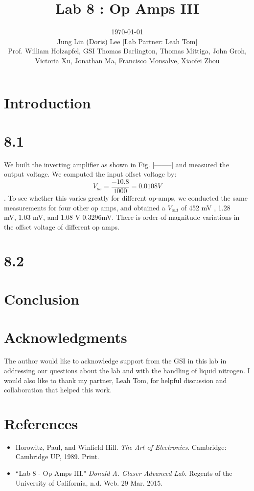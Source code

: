 \documentclass[authoryear, 12pt,5p, times]{elsarticle}
\begin{document}
\begin{frontmatter}
\title{Lab 8 : Op Amps III}
\author{\today \quad \\Jung Lin (Doris) Lee [Lab Partner: Leah Tom]\\Prof. William Holzapfel, GSI Thomas Darlington, Thomas Mittiga, John Groh,  \\Victoria Xu, Jonathan Ma, Francisco Monsalve, Xiaofei Zhou\vspace{-30pt}}	 
\end{frontmatter}
\section*{Introduction\label{intro}}
 \section*{8.1}
We built the inverting amplifier as shown in Fig. [--------]  and measured the output voltage. We computed the input offset voltage by: 
\begin{equation}
V_{os}  = \frac{-10.8}{1000}  = 0.0108 V
\end{equation}. To see whether this varies greatly for different op-amps, we conducted the same measurements for four other op amps, and obtained a $V_{out}$ of 452 mV , 1.28 mV,-1.03 mV, and 1.08 V \pm 0.3296mV. There is order-of-magnitude variations in the offset voltage of different op amps.
 \section*{8.2}
\section*{Conclusion}
 \section*{Acknowledgments}
\begin{footnotesize}
The author would like to acknowledge support from the GSI in this lab in addressing our questions about the lab and with the handling of liquid nitrogen. I would also like to thank my partner, Leah Tom, for helpful discussion and collaboration that helped this work. %
\end{footnotesize}
  \section*{References}
 \begin{footnotesize}
 \begin{itemize}
 \item Horowitz, Paul, and Winfield Hill. \textit{The Art of Electronics}. Cambridge: Cambridge UP, 1989. Print.
 \item ``Lab 8 - Op Amps III." \textit{Donald A. Glaser Advanced Lab.} Regents of the University of California, n.d. Web. 29 Mar. 2015.
\end{itemize} 
  \end{footnotesize}
\end{document}
